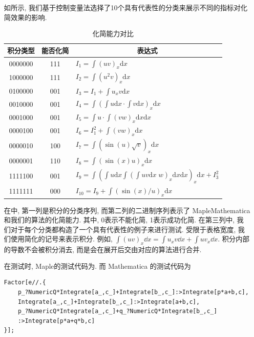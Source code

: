 如所示, 我们基于控制变量法选择了10个具有代表性的分类来展示不同的指标对化简效果的影响. 

\begin{table}[htbp]
\renewcommand{\arraystretch}{1.25}
\centering
\caption{化简能力对比} \label{tb1}
\renewcommand{\dd}[1]{\mathrm{d}#1}
\renewcommand{\ii}[1]{\int\!{#1\dd x}}
\begin{tabular}{ccl}
\hline
积分类型 & 能否化简 & \multicolumn{1}{c}{表达式} \\
\hline
0000000 & 111 & $I_1=\int\!{(uv)_x\dd x}$\\ 
1000000 & 111 & $I_2=\int\!{(u^2v)_x\dd x}$\\ 
0100000 & 001 & $I_3=I_1+\int\!{u_xv\dd x}$\\ 
0010000 & 001 & $I_4=\int\!{(\int\!{u\dd x}\cdot \int\!{v\dd x})_x\dd x}$\\
0001000 & 001 & $I_5=\int\!{u\cdot \int\!{(vw)_x\dd x}\dd x}$\\
0000100 & 001 & $I_6=I_1^2+\int\!{(vw)_x\dd x}$\\
0000010 & 100 & $I_7=\int\!{(\sin(u)\sqrt{v})_x\dd x}$\\
0000001 & 110 & $I_8=\int\!{(\sin(x)u)_x\dd x}$\\
1111100 & 001 & $I_9=\int\!{(\int\!{u\dd x}\int\!{(\int\!{uv\dd x}\;w)_x\dd x\dd x})_x\dd x}+I_3^2$\\
1111111 & 000 & $I_{10}=I_9+\int\!{(\sin(x)/u)_x\dd x}$\\
\hline
\end{tabular}
\end{table} 

在中, 第一列是积分的分类序列, 而第二列的二进制序列表示了 Maple\D Mathematica 和我们的算法的化简能力. 其中, 0表示不能化简, 1表示成功化简. 在第三列中, 我们对于每个分类都构造了一个具有代表性的例子来进行测试. 受限于表格宽度, 我们使用简化的记号来表示积分. 例如, $\int\!{(uv)_x\dd x}=\int\!{u_xv\dd x}+\int\!{uv_x\dd x}$. 积分内部的导数不会被积分消去, 而是会在展开后交由对应的算法进行合并.

在测试时, Maple的测试代码为. 而 Mathematica 的测试代码为
\begin{verbatim}
Factor[e//.{
    p_?NumericQ*Integrate[a_,c_]+Integrate[b_,c_]:>Integrate[p*a+b,c],
    Integrate[a_,c_]+Integrate[b_,c_]:>Integrate[a+b,c],
    p_?NumericQ*Integrate[a_,c_]+q_?NumericQ*Integrate[b_,c_]
    :>Integrate[p*a+q*b,c]
}];
\end{verbatim}

